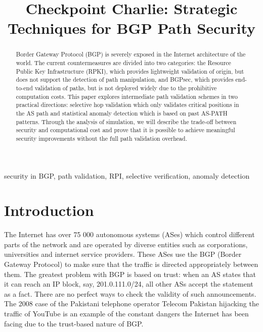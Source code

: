 \documentclass[conference]{IEEEtran}
\begin{document}
\title{Checkpoint Charlie: Strategic Techniques for BGP Path Security}

\author{
\and
{}
}

\maketitle

\begin{abstract}
Border Gateway Protocol (BGP) is severely exposed in the Internet architecture of the world. The current countermeasures are divided into two categories: the Resource Public Key Infrastructure (RPKI), which provides lightweight validation of origin, but does not support the detection of path manipulation, and BGPsec, which provides end-to-end validation of paths, but is not deployed widely due to the prohibitive computation costs. This paper explores intermediate path validation schemes in two practical directions: selective hop validation which only validates critical positions in the AS path and statistical anomaly detection which is based on past AS-PATH patterns. Through the analysis of simulation, we will describe the trade-off between security and computational cost and prove that it is possible to achieve meaningful security improvements without the full path validation overhead.
\end{abstract}

\begin{IEEEkeywords}
security in BGP, path validation, RPI, selective verification, anomaly detection
\end{IEEEkeywords}

\section{Introduction}

The Internet has over 75 000 autonomous systems (ASes) which control different parts of the network and are operated by diverse entities such as corporations, universities and internet service providers. These ASes use the BGP (Border Gateway Protocol) to make sure that the traffic is directed appropriately between them. The greatest problem with BGP is based on trust: when an AS states that it can reach an IP block, say, 201.0.111.0/24, all other ASs accept the statement as a fact. There are no perfect ways to check the validity of such announcements. The 2008 case of the Pakistani telephone operator Telecom Pakistan hijacking the traffic of YouTube is an example of the constant dangers the Internet has been facing due to the trust-based nature of BGP.
\end{document}

